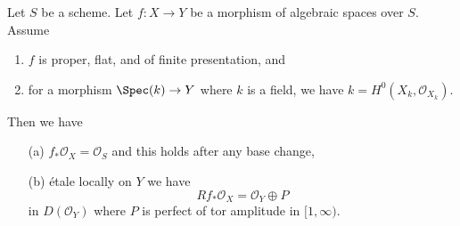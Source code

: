 \begin{lemma}
\label{lemma-proper-flat-h0}
Let $S$ be a scheme.
Let $f : X \to Y$ be a morphism of algebraic spaces over $S$. Assume
\begin{enumerate}
\item $f$ is proper, flat, and of finite presentation, and
\item for a morphism $\Spec(k) \to Y$ where $k$ is a field, we have
$k = H^0(X_k, \mathcal{O}_{X_k})$.
\end{enumerate}
Then we have
\begin{enumerate}
\item[(a)] $f_*\mathcal{O}_X = \mathcal{O}_S$ and
this holds after any base change,
\item[(b)] \'etale locally on $Y$ we have
$$
Rf_*\mathcal{O}_X = \mathcal{O}_Y \oplus P
$$
in $D(\mathcal{O}_Y)$
where $P$ is perfect of tor amplitude in $[1, \infty)$.
\end{enumerate}
\end{lemma}

